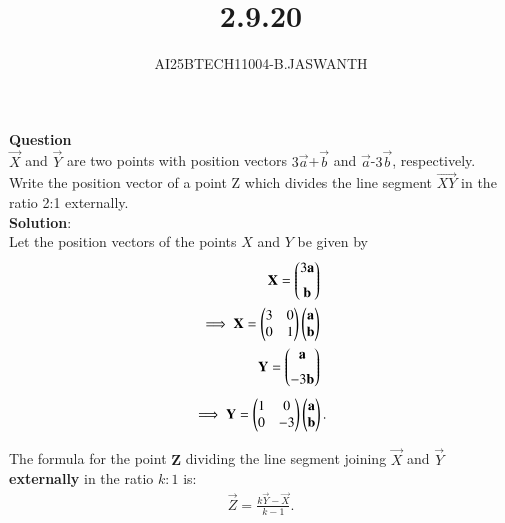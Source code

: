 \documentclass[journal]{IEEEtran}
\begin{document}

\vspace{3cm}


\renewcommand{\thetable}{\theenumi}




\vspace{3cm}


\title{2.9.20}
\author{AI25BTECH11004-B.JASWANTH}
{\let\newpage\relax\maketitle}


\renewcommand{\thefigure}{\theenumi}
\renewcommand{\thetable}{\theenumi}
\setlength{\intextsep}{10pt} %

\textbf{Question}\\
$\vec{X}$ and  $\vec{Y}$ are two points with position vectors $3\vec{a}$+$\vec{b}$  and  $\vec{a}$-$3\vec{b}$, respectively. Write the position vector of a point Z  which divides the line segment  $\vec{XY}$ in the ratio 2:1 externally.\\
\textbf{Solution}:\\
Let the position vectors of the points $X$ and $Y$ be given by
\begin{align}
    \mathbf{X}=\begin{pmatrix}3\mathbf{a}\\[6pt]
    \mathbf{b}\end{pmatrix}\\
  \implies  \mathbf{X} = \begin{pmatrix}3 & 0 \\ 
        0 & 1\end{pmatrix}
\begin{pmatrix}\mathbf{a} \\ \mathbf{b}\end{pmatrix}\\
 \mathbf{Y}=\begin{pmatrix}\mathbf{a}\\[6pt]
    -3\mathbf{b}\end{pmatrix}
\end{align}
\begin{align}
\implies \mathbf{Y} = 
\begin{pmatrix}1 & 0 \\ 
     0 & -3\end{pmatrix}
\begin{pmatrix}\mathbf{a} \\ \mathbf{b}\end{pmatrix}.
\end{align}

\vspace{1em}

The formula for the point $\mathbf{Z}$ dividing the line segment joining $\vec{X}$ and $\vec{Y}$ \textbf{externally} in the ratio $k:1$ is:
\begin{align}
\vec{Z} = \frac{k\vec{Y} - \vec{X}}{k - 1}.
\end{align}
\end{document}
